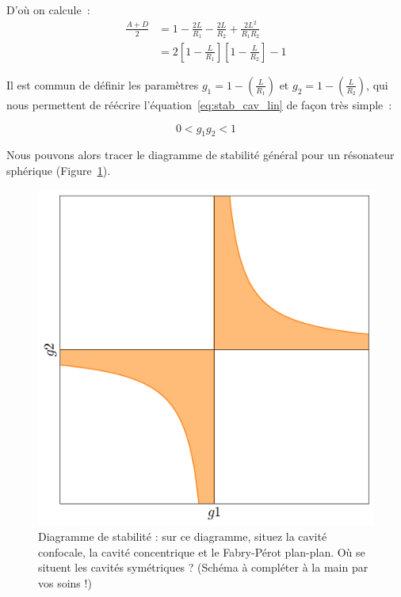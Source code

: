 \documentclass[a4paper]{book}
\begin{document}
D'où on calcule~:
\begin{align}
\label{eq:stab_cav_lin}
    \frac{A+D}{2}&=1-\frac{2L}{R_1}-\frac{2L}{R_2}+\frac{2L^2}{R_1R_2}\\
                 &=2\left[1-\frac{L}{R_1}\right]\left[1-\frac{L}{R_2}\right]-1
\end{align}

Il est commun de définir les paramètres $g_1 = 1 -\left(\frac{L}{R_1}\right)$ et $g_2 = 1 -\left(\frac{L}{R_2}\right)$, qui nous permettent de réécrire l'équation~\ref{eq:stab_cav_lin} de façon très simple~:

\begin{equation}
    0<g_1g_2<1
\end{equation}

Nous pouvons alors tracer le diagramme de stabilité général pour un résonateur sphérique (Figure~\ref{fig:diag_stab}). 

\begin{figure}[!htbp]
\begin{center}
\includegraphics[width=12cm]{pictures/stability.png}
\end{center}
\caption{Diagramme de stabilité : sur ce diagramme, situez la cavité confocale, la cavité concentrique et le Fabry-Pérot plan-plan. Où se situent les cavités symétriques ? (Schéma à compléter à la main par vos soins !)}
\label{fig:diag_stab}
\end{figure}
\end{document}
